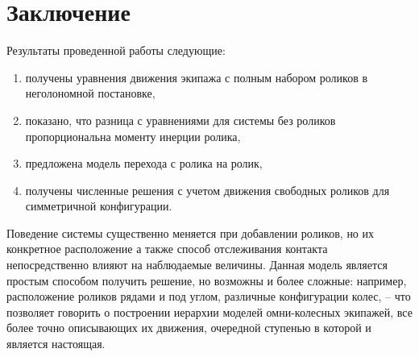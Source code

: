 






%





\section{Заключение}

Результаты проведенной работы следующие:
\begin{enumerate}
    \item получены уравнения движения экипажа с полным набором роликов в неголономной постановке,

    \item показано, что разница с уравнениями для системы без роликов пропорциональна моменту инерции ролика,

    \item предложена модель перехода с ролика на ролик,

    \item получены численные решения с учетом движения свободных роликов для симметричной конфигурации.
\end{enumerate}

Поведение системы существенно меняется при добавлении роликов, но их конкретное расположение а также способ отслеживания контакта непосредственно влияют на наблюдаемые величины. Данная модель является простым способом получить решение, но возможны и более сложные: например, расположение роликов рядами и под углом, различные конфигурации колес, -- что позволяет говорить о построении иерархии моделей омни-колесных экипажей, все более точно описывающих их движения, очередной ступенью в которой и является настоящая.


% 












